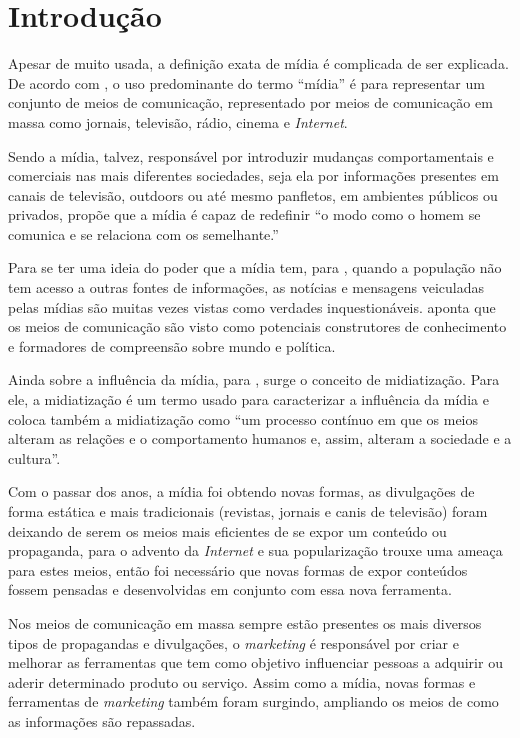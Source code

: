 \chapter[Introdução]{Introdução}
Apesar de muito usada, a definição exata de mídia é complicada de ser explicada. De acordo com \cite[p.49]{guazina2007}, o uso predominante do termo ``mídia'' é para representar um conjunto de meios de comunicação, representado por meios de comunicação em massa como jornais, televisão, rádio, cinema e \textit{Internet}.

Sendo a mídia, talvez, responsável por introduzir mudanças comportamentais e comerciais nas mais diferentes sociedades, seja ela por informações presentes em canais de televisão, outdoors ou até mesmo panfletos, em ambientes públicos ou privados, \cite[p.3]{escobar2007} propõe que a mídia é capaz de redefinir ``o modo como o homem se comunica e se relaciona com os semelhante.''

Para se ter uma ideia do poder que a mídia tem, para \cite{silva2007}, quando a população não tem acesso a outras fontes de informações, as notícias e mensagens veiculadas pelas mídias são muitas vezes vistas como verdades inquestionáveis. \cite[p.53]{guazina2007} aponta que os meios de comunicação são visto como potenciais construtores de conhecimento e formadores de compreensão sobre mundo e política.

Ainda sobre a influência da mídia, para \cite[p.54]{hjarvard2012}, surge o conceito de midiatização. Para ele, a midiatização é um termo usado para caracterizar a influência da mídia e coloca também a midiatização como ``um processo contínuo em que os meios alteram as relações e o comportamento humanos e, assim, alteram a sociedade e a cultura''. 

Com o passar dos anos, a mídia foi obtendo novas formas, as divulgações de forma estática e mais tradicionais (revistas, jornais e canis de televisão) foram deixando de serem os meios mais eficientes de se expor um conteúdo ou propaganda, para \cite{meditsch2001} o advento da \textit{Internet} e sua popularização trouxe uma ameaça para estes meios, então foi necessário que novas formas de expor conteúdos fossem pensadas e desenvolvidas em conjunto com essa nova ferramenta.

Nos meios de comunicação em massa sempre estão presentes os mais diversos tipos de propagandas e divulgações, o \textit{marketing} é responsável por criar e melhorar as ferramentas que tem como objetivo influenciar pessoas a adquirir ou aderir determinado produto ou serviço. Assim como a mídia, novas formas e ferramentas de \textit{marketing} também foram surgindo, ampliando os meios de como as informações são repassadas. 

